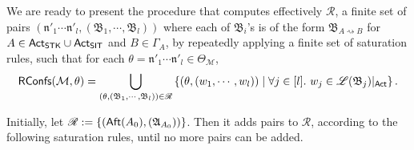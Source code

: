 \documentclass[preprint,12pt]{elsarticle}
\newcommand\rectangled[1]{\tikz[baseline=(torect.base)]{
    \node[shape = rectangle, draw, inner sep=0pt, outer sep = 0pt] (torect) {#1}
    }
}
\newcommand{\mrectangled}[1]{\text{\rectangled{\ensuremath{#1}}}}
\newcommand{\mhcancel}[1]{\mrectangled{#1}}
\newcommand\Mm{{\mathcal{M} }}
\newcommand\act{{\sf Act}}
\newcommand\aft{{\sf Aft}}
\newcommand\singletask{{\sf STK}}
\newcommand\singleinstance{{\sf SIT}}
\newcommand\confs{{\mathsf{Confs} }}
\newcommand\aname{\mathfrak{n}}
\newcommand\AutReach{\mathscr{R}}
\newcommand\RConfs{\mathsf{RConfs}}
\newcommand\Aut{{\mathfrak{A} }}
\newcommand\AutB{{\mathfrak{B} }}
\newcommand\Lang{{\mathscr{L} }}
\begin{document}
We are ready to present the procedure that computes effectively $\AutReach$, a finite set of pairs $(\aname'_1 \cdots \aname'_l, (\AutB_1, \cdots, \AutB_l))$ where each of $\AutB_i$'s is of the form $\AutB_{A\rightsquigarrow B}$ for $A \in \act_\singletask\cup\act_\singleinstance$ and $B \in \Gamma_A$, by repeatedly applying a finite set of saturation rules, such that
for each $\theta = \aname'_1 \cdots \aname'_{l} \in \Theta_\Mm$, 
$$\RConfs(\Mm, \theta) =\bigcup \limits_{(\theta, (\AutB_1, \cdots, \AutB_l)) \in \AutReach} \left\{(\theta, (w_1, \cdots, w_{l})) \mid \forall j \in [l].\ w_j \in \Lang(\AutB_{j})|_{\act} \right\}.$$


Initially, let $\AutReach := \{(\aft(A_0),(\Aut_{A_0}))\}$.
Then it adds pairs to $\AutReach$, according to the following saturation rules, until no more pairs can be added. 
\end{document}
